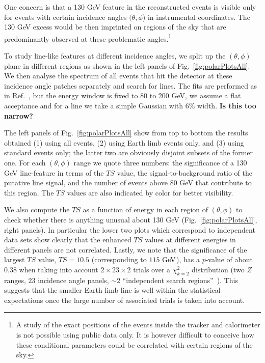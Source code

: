 \documentclass[aps,twocolumn,prd,superscriptaddress,showpacs,nofootinbib,fixfloat]{revtex4}
\newcommand{\GeV}{{\rm ~GeV}}
\begin{document}

One concern is that a 130 GeV feature in the
reconstructed events is visible only for events with certain
incidence angles $(\theta, \phi$) in instrumental
coordinates. The 130 GeV excess would be then imprinted on
regions of the sky that are predominantly observed at
these problematic angles.\footnote{A study of the exact
positions of the events inside the tracker and calorimeter
is not possible using public data only.
It is however difficult to conceive how these conditional
parameters could be correlated with certain regions of the
sky.}

To study line-like features at different incidence
angles, we split up the $(\theta, \phi)$ plane in different
regions as shown in the left panels of
Fig.~\ref{fig:polarPlotsAll}. We then analyse the spectrum
of all events that hit the detector at these incidence
angle patches separately and search for lines. The fits are
performed as in Ref.~\cite{Weniger:2012}, but the energy
window is fixed to 80 to 200 GeV, we assume a flat
acceptance and for a line we take a simple Gaussian with $6\%$
width.  {\bf Is this too narrow?}

The left panels of Fig.~\ref{fig:polarPlotsAll} show from
top to bottom the results obtained (1) using all events, (2)
using Earth limb events only, and (3) using standard events
only; the latter two are obviously disjoint subsets of the
former one. For each $(\theta, \phi)$ range we quote three
numbers: the significance of a 130 GeV line-feature in terms
of the $TS$ value, the signal-to-background ratio of the
putative line signal, and the number of events above 80 GeV
that contribute to this region. The $TS$ values are also
indicated by color for better visibility.


We also compute the $TS$ as a function of energy in each region of
$(\theta,\phi)$ to check whether there is anything unusual about 130 GeV
(Fig.~\ref{fig:polarPlotsAll}, right panels). In
particular the lower two plots which correspond to
independent data sets show clearly that the enhanced $TS$
values at different energies in different panels are not
correlated. Lastly, we note that the significance of the
largest $TS$ value, $TS=10.5$ (corresponding to $115\GeV$), has a $p$-value of
about $0.38$ when taking into account
$2\times23\times2$ trials over a $\chi_{k=2}^2$ distribution
(two $Z$ ranges, $23$ incidence angle panels, $\sim2$
``independent search regions''~\cite{Vittels}). This
suggests that the smaller Earth limb line is well within the
statistical expectations once the large number of associated
trials is taken into account.
\end{document}
